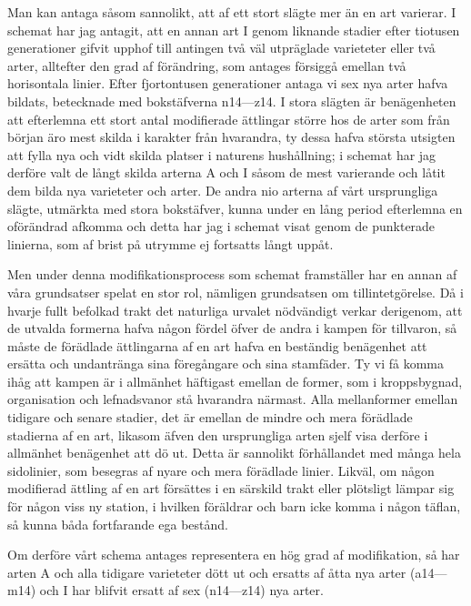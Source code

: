Man kan antaga såsom sannolikt, att af ett stort slägte mer än en art varierar. I schemat har jag antagit, att en annan art I genom liknande stadier efter tiotusen generationer gifvit upphof till antingen två väl utpräglade varieteter eller två arter, alltefter den grad af förändring, som antages försiggå emellan två horisontala linier. Efter fjortontusen generationer antaga vi sex nya arter hafva bildats, betecknade med bokstäfverna n14—z14. I stora slägten är benägenheten att efterlemna ett stort antal modifierade ättlingar större hos de arter som från början äro mest skilda i karakter från hvarandra, ty dessa hafva största utsigten att fylla nya och vidt skilda platser i naturens hushållning; i schemat har jag derföre valt de långt skilda arterna A och I såsom de mest varierande och låtit dem bilda nya varieteter och arter. De andra nio arterna af vårt ursprungliga slägte, utmärkta med stora bokstäfver, kunna under en lång period efterlemna en oförändrad afkomma och detta har jag i schemat visat genom de punkterade linierna, som af brist på utrymme ej fortsatts långt uppåt.

Men under denna modifikationsprocess som schemat framställer har en annan af våra grundsatser spelat en stor rol, nämligen grundsatsen om tillintetgörelse. Då i hvarje fullt befolkad trakt det naturliga urvalet nödvändigt verkar derigenom, att de utvalda formerna hafva någon fördel öfver de andra i kampen för tillvaron, så måste de förädlade ättlingarna af en art hafva en beständig benägenhet att ersätta och undantränga sina föregångare och sina stamfäder. Ty vi få komma ihåg att kampen är i allmänhet häftigast emellan de former, som i kroppsbygnad, organisation och lefnadsvanor stå hvarandra närmast. Alla mellanformer emellan tidigare och senare stadier, det är emellan de mindre och mera förädlade stadierna af en art, likasom äfven den ursprungliga arten sjelf visa derföre i allmänhet benägenhet att dö ut. Detta är sannolikt förhållandet med många hela sidolinier, som besegras af nyare och mera förädlade linier. Likväl, om någon modifierad ättling af en art försättes i en särskild trakt eller plötsligt lämpar sig för någon viss ny station, i hvilken föräldrar och barn icke komma i någon täflan, så kunna båda fortfarande ega bestånd.

Om derföre vårt schema antages representera en hög grad af modifikation, så har arten A och alla tidigare varieteter dött ut och ersatts af åtta nya arter (a14—m14) och I har blifvit ersatt af sex (n14—z14) nya arter.

